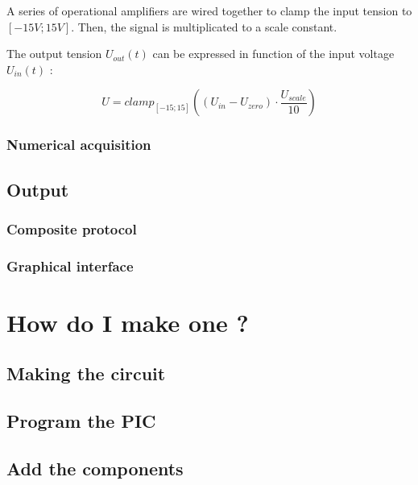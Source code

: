 \documentclass[11pt]{article}
\begin{document}
A series of operational amplifiers are wired together to clamp the input tension to $[-15V;15V]$. Then, the signal is multiplicated to a scale constant.

The output tension $U_{out}(t)$ can be expressed in function of the input voltage $U_{in}(t)$ :

\[ U = clamp_{[-15;15]}((U_{in} - U_{zero}) \cdot \frac{U_{scale}}{10}) \]



\subsubsection{Numerical acquisition}

\subsection{Output}

\subsubsection{Composite protocol}

\subsubsection{Graphical interface}


\section {How do I make one ?}

\subsection{Making the circuit}

\subsection{Program the PIC}

\subsection{Add the components}
\end{document}
